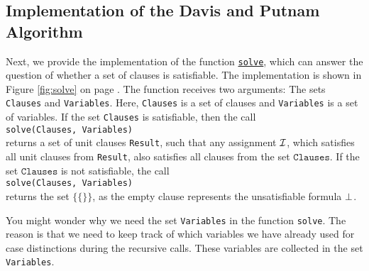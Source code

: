 \subsection{Implementation of the Davis and Putnam Algorithm}
Next, we provide the implementation of the function 
\href{https://github.com/karlstroetmann/Logic/blob/master/SetlX/davis-putnam.stlx}{\texttt{solve}}, 
which can answer the question of whether a set of clauses is satisfiable. The
implementation is shown in Figure \ref{fig:solve} on page \pageref{fig:solve}.
The function receives two arguments: The sets \texttt{Clauses} and \texttt{Variables}.
Here, \texttt{Clauses} is a set of clauses and \texttt{Variables} is a set of
variables. If the set \texttt{Clauses} is satisfiable, then the call
\\[0.2cm]
\hspace*{1.3cm}
\texttt{solve(Clauses, Variables)} 
\\[0.2cm]
returns a set of unit clauses \texttt{Result}, such
that any assignment $\mathcal{I}$, which satisfies all unit clauses from \texttt{Result}, also satisfies all clauses from
the set $\texttt{Clauses}$. If the set $\texttt{Clauses}$ is not satisfiable, the call
\\[0.2cm]
\hspace*{1.3cm}
\texttt{solve(Clauses, Variables)} 
\\[0.2cm]
returns the set $\bigl\{ \{\} \bigr\}$, as the empty clause represents the unsatisfiable formula $\bot$.

You might wonder why we need the set \texttt{Variables} in the function \texttt{solve}. The reason is that we need to keep track of which variables we have already used for case distinctions during the recursive calls. These variables are collected in the set \texttt{Variables}.

